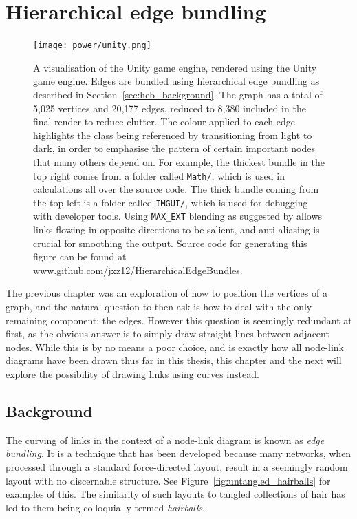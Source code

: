 \chapter{Hierarchical edge bundling}
\label{chap:heb}
\begin{figure}
  \centering
  \texttt{[image: power/unity.png]}
  \caption[The Unity game engine, visualised using the Unity game engine]{A visualisation of the Unity game engine, rendered using the Unity game engine.
  Edges are bundled using hierarchical edge bundling as described in Section~\ref{sec:heb_background}. The graph has a total of 5,025 vertices and 20,177 edges, reduced to 8,380 included in the final render to reduce clutter. The colour applied to each edge highlights the class being referenced by transitioning from light to dark, in order to emphasise the pattern of certain important nodes that many others depend on. For example, the thickest bundle in the top right comes from a folder called \texttt{Math/}, which is used in calculations all over the source code. The thick bundle coming from the top left is a folder called \texttt{IMGUI/}, which is used for debugging with developer tools.
  Using \texttt{MAX\_EXT} blending as suggested by \citet{Holten2006} allows links flowing in opposite directions to be salient, and anti-aliasing is crucial for smoothing the output. Source code for generating this figure can be found at \url{www.github.com/jxz12/HierarchicalEdgeBundles}.}
  \label{fig:metaunity}
\end{figure}
The previous chapter was an exploration of how to position the vertices of a graph, and the natural question to then ask is how to deal with the only remaining component: the edges. However this question is seemingly redundant at first, as the obvious answer is to simply draw straight lines between adjacent nodes. While this is by no means a poor choice, and is exactly how all node-link diagrams have been drawn thus far in this thesis, this chapter and the next will explore the possibility of drawing links using curves instead.

\section{Background}
\label{sec:edges_background}
The curving of links in the context of a node-link diagram is known as \textit{edge bundling}. It is a technique that has been developed because many networks, when processed through a standard force-directed layout, result in a seemingly random layout with no discernable structure. See Figure~\ref{fig:untangled_hairballs} for examples of this. The similarity of such layouts to tangled collections of hair has led to them being colloquially termed \textit{hairballs}.

